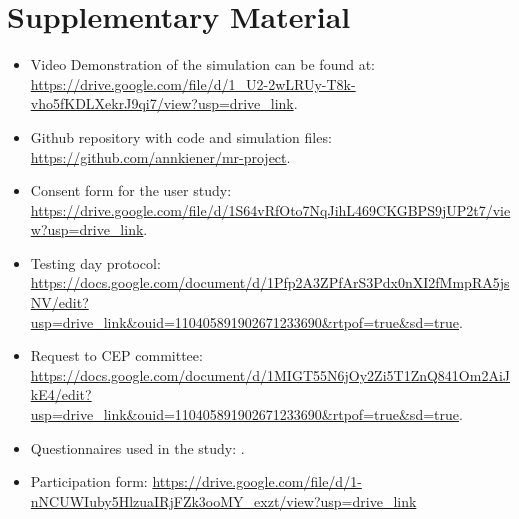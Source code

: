 \chapter{Supplementary Material}


\begin{itemize}

\item   Video Demonstration of the simulation can be found at: \url{https://drive.google.com/file/d/1_U2-2wLRUy-T8k-vho5fKDLXekrJ9qi7/view?usp=drive_link}.
\item Github repository with code and simulation files: \url{https://github.com/annkiener/mr-project}.
\item Consent form for the user study: \url{https://drive.google.com/file/d/1S64vRfOto7NqJihL469CKGBPS9jUP2t7/view?usp=drive_link}.
\item Testing day protocol: \url{https://docs.google.com/document/d/1Pfp2A3ZPfArS3Pdx0nXI2fMmpRA5jsNV/edit?usp=drive_link&ouid=110405891902671233690&rtpof=true&sd=true}.
\item Request to CEP committee: \url{https://docs.google.com/document/d/1MIGT55N6jOy2Zi5T1ZnQ841Om2AiJkE4/edit?usp=drive_link&ouid=110405891902671233690&rtpof=true&sd=true}.
\item Questionnaires used in the study: \url{}.
\item Participation form: \url{https://drive.google.com/file/d/1-nNCUWIuby5HlzuaIRjFZk3ooMY_exzt/view?usp=drive_link}

\end{itemize}